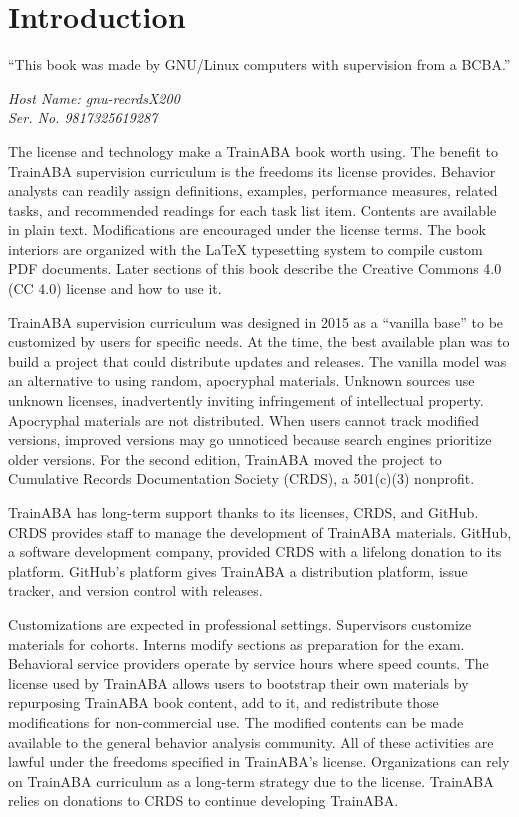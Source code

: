 %
%
%
\chapter{Introduction}
\epigraph{``This book was made by GNU/Linux computers with supervision from a BCBA.''}{\textit{Host Name: gnu-recrdsX200\\Ser. No. 9817325619287}}

The license and technology make a TrainABA book worth using. The benefit to TrainABA supervision curriculum is the freedoms its license provides. Behavior analysts can readily assign definitions, examples, performance measures, related tasks, and recommended readings for each task list item. Contents are available in plain text. Modifications are encouraged under the license terms. The book interiors are organized with the \LaTeX{} typesetting system to compile custom PDF documents. Later sections of this book describe the Creative Commons 4.0 (CC 4.0) license and how to use it. 

TrainABA supervision curriculum was designed in 2015 as a ``vanilla base''  to be customized by users for specific needs. At the time, the best available plan was to build a project that could distribute updates and releases. The vanilla model was an alternative to using random, apocryphal materials. Unknown sources use unknown licenses, inadvertently inviting infringement of intellectual property. Apocryphal materials are not distributed. When users cannot track modified versions, improved versions may go unnoticed because search engines prioritize older versions. For the second edition, TrainABA moved the project to Cumulative Records Documentation Society (CRDS), a 501(c)(3) nonprofit. 

TrainABA has long-term support thanks to its licenses, CRDS, and GitHub. CRDS provides staff to manage the development of TrainABA materials. GitHub, a software development company, provided CRDS with a lifelong donation to its platform. GitHub's platform gives TrainABA a distribution platform, issue tracker, and version control with releases.

Customizations are expected in professional settings. Supervisors customize materials for cohorts. Interns modify sections as preparation for the exam. Behavioral service providers operate by service hours where speed counts. The license used by TrainABA allows users to bootstrap their own materials by repurposing TrainABA book content, add to it, and redistribute those modifications for non-commercial use. The modified contents can be made available to the general behavior analysis community. All of these activities are lawful under the freedoms specified in TrainABA's license. Organizations can rely on TrainABA curriculum as a long-term strategy due to the license. TrainABA relies on donations to CRDS to continue developing TrainABA. 

